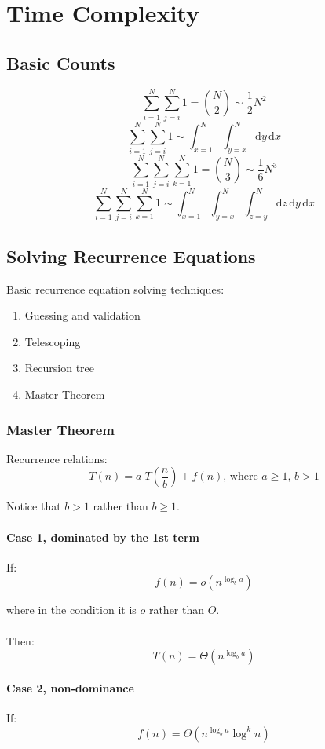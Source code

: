 \chapter{Time Complexity}

\section{Basic Counts}
$$
\sum_{i=1}^N{\sum_{j=i}^N{1}} = {N \choose 2} \sim \frac{1}{2} N^2
$$
$$
\sum_{i=1}^N{\sum_{j=i}^N{1}} \sim \int_{x=1}^N \int_{y=x}^N  \mathrm{d}y\, \mathrm{d}x
$$
$$
\sum_{i=1}^N{\sum_{j=i}^N{\sum_{k=1}^N{1}}} = {N \choose 3} \sim \frac{1}{6} N^3
$$
$$
\sum_{i=1}^N{\sum_{j=i}^N{\sum_{k=1}^N{1}}} \sim \int_{x=1}^N \int_{y=x}^N \int_{z=y}^N \mathrm{d}z\,
\mathrm{d}y\, \mathrm{d}x
$$

\section{Solving Recurrence Equations}
Basic recurrence equation solving techniques:
\begin{enumerate}
\item Guessing and validation
\item Telescoping
\item Recursion tree
\item Master Theorem
\end{enumerate}

\subsection{Master Theorem}
Recurrence relations:
$$T(n) = a \; T\!\left(\frac{n}{b}\right) + f(n)\mbox{, where }a \geq 1 \mbox{, } b > 1$$

Notice that $b>1$ rather than $b\geq1$.

\subsubsection*{Case 1, dominated by the 1st term}
If:
$$f(n) = o(n^{\log_b a})$$

where in the condition it is $o$ rather than $O$. \\\\
Then:
$$T(n) = \Theta(n^{\log_b a})$$
\subsubsection*{Case 2, non-dominance}
If:
$$f(n) = \Theta(n^{\log_b a} \log^{k} n)$$

